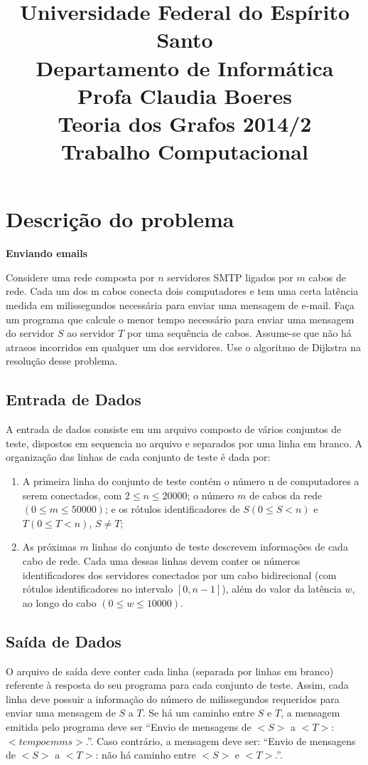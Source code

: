 \documentclass[a4paper,10pt]{article}
\title{Universidade Federal do Espírito Santo\\Departamento de Informática\\Profa Claudia Boeres\\Teoria dos Grafos 2014/2\\ \textbf{Trabalho Computacional}}
\date{}
\begin{document}
\maketitle

\section{Descrição do problema}
 \begin{large}
\textbf{Enviando emails}
\end{large}
\newline
\newline
Considere uma rede composta por $n$ servidores SMTP ligados por $m$
cabos de rede. Cada um dos m cabos conecta dois computadores e tem
uma certa latência medida em milissegundos necessária para enviar
uma mensagem de e-mail. Faça um programa que calcule o menor tempo
necessário para enviar uma mensagem do servidor $S$ ao servidor $T$
por uma sequência de cabos. Assume-se que não há atrasos
incorridos em qualquer um dos servidores. Use o algoritmo de
Dijkstra na resolução desse problema.
\subsection{Entrada de Dados}

A entrada de dados consiste em um arquivo composto de vários
conjuntos de teste, dispostos em sequencia no arquivo e separados
por uma linha em branco. A organização das linhas de cada conjunto
de teste é dada por:

\begin{enumerate}
\item A primeira linha do conjunto de teste contém o número n de
computadores a serem conectados, com $2 \leq n \leq 20000$; o número
$m$ de cabos da rede $(0 \leq m \leq 50000)$; e os rótulos
identificadores de $S (0 \leq S < n)$ e $T (0 \leq T < n)$, $S \neq
 T$;
 
 \item As próximas $m$ linhas do conjunto de teste descrevem
informações de cada cabo de rede. Cada uma dessas linhas
devem conter os números identificadores dos servidores
conectados por um cabo bidirecional (com rótulos
identificadores no intervalo $[0, n-1]$), além do valor da
latência $w$, ao longo do cabo $(0 \leq w \leq 10000)$.

\end{enumerate}

\subsection{Saída de Dados}
O arquivo de saída deve conter cada linha (separada por linhas em
branco) referente à resposta do seu programa para cada conjunto de
teste. Assim, cada linha deve possuir a informação do número de
milissegundos requeridos para enviar uma mensagem de $S$ a $T$. Se há
um caminho entre $S$ e $T$, a mensagem emitida pelo programa deve ser
“Envio de mensagens de $<S>$ a $<T>$: $<tempo em ms>$.”. Caso contrário,
a mensagem deve ser: “Envio de mensagens de $<S>$ a $<T>$: não há
caminho entre $<S>$ e $<T>$.”.
\end{document}
